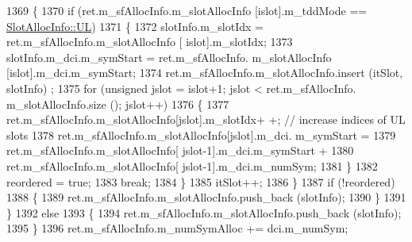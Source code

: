 \begin{DoxyCode}
1369                                 \{
1370                                         \textcolor{keywordflow}{if} (ret.m\_sfAllocInfo.m\_slotAllocInfo [islot].m\_tddMode == 
      \hyperlink{structns3_1_1SlotAllocInfo_a6cad60db1d39034f1851e2cea625fe5da916b5be54594ead6ed677c570311cad2}{SlotAllocInfo::UL})
1371                                         \{
1372                                                 slotInfo.m\_slotIdx = ret.m\_sfAllocInfo.m\_slotAllocInfo [
      islot].m\_slotIdx;
1373                                                 slotInfo.m\_dci.m\_symStart = ret.m\_sfAllocInfo.
      m\_slotAllocInfo [islot].m\_dci.m\_symStart;
1374                                                 ret.m\_sfAllocInfo.m\_slotAllocInfo.insert (itSlot, slotInfo)
      ;
1375                                                 \textcolor{keywordflow}{for} (\textcolor{keywordtype}{unsigned} jslot = islot+1; jslot < ret.m\_sfAllocInfo.
      m\_slotAllocInfo.size (); jslot++)
1376                                                 \{
1377                                                         ret.m\_sfAllocInfo.m\_slotAllocInfo[jslot].m\_slotIdx+
      +;       \textcolor{comment}{// increase indices of UL slots}
1378                                                         ret.m\_sfAllocInfo.m\_slotAllocInfo[jslot].m\_dci.
      m\_symStart =
1379                                                                         ret.m\_sfAllocInfo.m\_slotAllocInfo[
      jslot-1].m\_dci.m\_symStart +
1380                                                                         ret.m\_sfAllocInfo.m\_slotAllocInfo[
      jslot-1].m\_dci.m\_numSym;
1381                                                 \}
1382                                                 reordered = \textcolor{keyword}{true};
1383                                                 \textcolor{keywordflow}{break};
1384                                         \}
1385                                         itSlot++;
1386                                 \}
1387                                 \textcolor{keywordflow}{if} (!reordered)
1388                                 \{
1389                                         ret.m\_sfAllocInfo.m\_slotAllocInfo.push\_back (slotInfo);
1390                                 \}
1391                         \}
1392                         \textcolor{keywordflow}{else}
1393                         \{
1394                                 ret.m\_sfAllocInfo.m\_slotAllocInfo.push\_back (slotInfo);
1395                         \}
1396                         ret.m\_sfAllocInfo.m\_numSymAlloc += dci.m\_numSym;

\end{DoxyCode}
